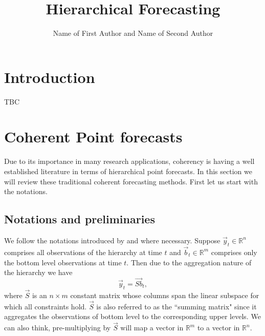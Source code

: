 \documentclass[graybox]{svmult}
\begin{document}
\title*{Hierarchical Forecasting}
\author{Name of First Author and Name of Second Author}
%
%
\maketitle



\section{Introduction}
TBC

\newpage
\section{Coherent Point forecasts} \label{CoherentF}

Due to its importance in many research applications, coherency is having a well established literature in terms of hierarchical point forecasts. In this section we will review these traditional coherent forecasting methods. First let us start with the notations. 

\subsection{Notations and preliminaries} 

We follow the notations introduced by \cite{Wickramasuriya2018} and \cite{Gamakumara2018} where necessary. Suppose $\vec{y}_t \in \mathbb{R}^n$ comprises all observations of the hierarchy at time $t$ and $\vec{b}_t \in \mathbb{R}^m$ comprises only the bottom level observations at time $t$. Then due to the aggregation nature of the hierarchy we have
\begin{equation}
\vec{y}_t = \vec{Sb}_t,
\end{equation}
where $\vec{S}$ is an $n \times m$ constant matrix whose columns span the linear subspace for which all constraints hold. $\vec{S}$ is also referred to as the ``summing matrix" since it aggregates the observations of bottom level to the corresponding upper levels. We can also think, pre-multiplying by $\vec{S}$ will map a vector in $\mathbb{R}^m$ to a vector in $\mathbb{R}^n$. 
\end{document}
